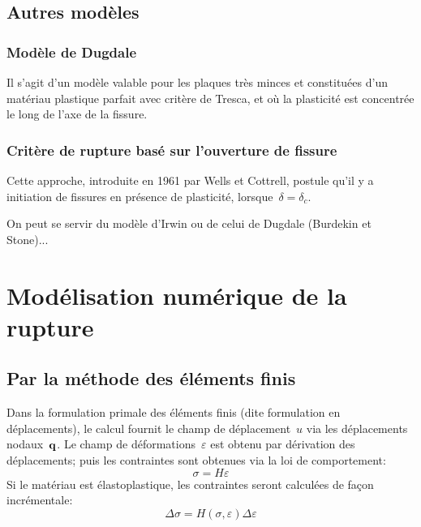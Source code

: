 \medskip
\subsection{Autres modèles}

\medskip
\subsubsection{Modèle de Dugdale}

Il s'agit d'un modèle valable pour les plaques très minces et constituées d'un matériau plastique parfait avec critère de Tresca, et où la plasticité est concentrée le long de l'axe de la fissure.

\medskip
\subsubsection{Critère de rupture basé sur l'ouverture de fissure}

Cette approche, introduite en 1961 par Wells et Cottrell, postule qu'il y a initiation de fissures en présence de plasticité, lorsque~$\delta=\delta_c$.

On peut se servir du modèle d'Irwin ou de celui de Dugdale (Burdekin et Stone)...


\medskip
\section{Modélisation numérique de la rupture}

\medskip
\subsection{Par la méthode des éléments finis}

Dans la formulation primale des éléments finis (dite formulation en déplacements), le calcul fournit le champ de déplacement~$u$ via les déplacements nodaux~$\VV{q}$. Le champ de déformations~$\varepsilon$ est obtenu par dérivation des déplacements; puis les contraintes sont obtenues via la loi de comportement: 
\begin{equation}\sigma=H\varepsilon\end{equation}
Si le matériau est élastoplastique, les contraintes seront calculées de façon incrémentale:
\begin{equation}\Delta\sigma=H(\sigma,\varepsilon)\Delta\varepsilon\end{equation}

